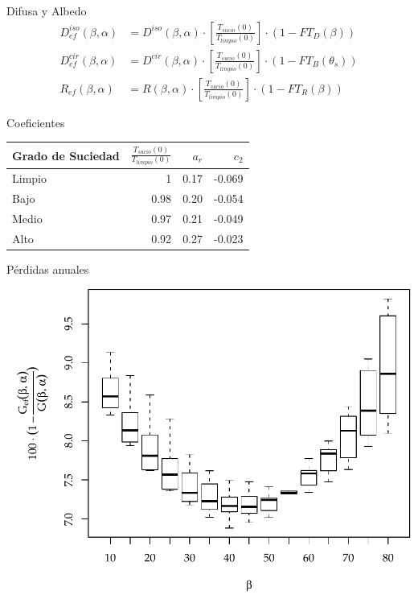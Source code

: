 \documentclass[xcolor={usenames,svgnames,dvipsnames}]{beamer}
\begin{document}
\begin{frame}[label={sec:org26ee36b}]{Difusa y Albedo}
\begin{align*}
D_{ef}^{iso}(\beta,\alpha) &= D^{iso}(\beta,\alpha)\cdot\left[\frac{T_{sucio}(0)}{T_{limpio}(0)}\right]\cdot(1-FT_{D}(\beta))\\
D_{ef}^{cir}(\beta,\alpha) &= D^{cir}(\beta,\alpha)\cdot\left[\frac{T_{sucio}(0)}{T_{limpio}(0)}\right]\cdot(1-FT_{B}(\theta_{s}))\\
R_{ef}(\beta,\alpha) &= R(\beta,\alpha)\cdot\left[\frac{T_{sucio}(0)}{T_{limpio}(0)}\right]\cdot(1-FT_{R}(\beta))
\end{align*}
\end{frame}
\begin{frame}[label={sec:org3795789}]{Coeficientes}
\begin{center}
\begin{tabular}{lrrr}
Grado de Suciedad & \(\frac{T_{sucio}(0)}{T_{limpio}(0)}\) & \(a_{r}\) & \(c_{2}\)\\
\hline
Limpio & 1 & 0.17 & -0.069\\
Bajo & 0.98 & 0.20 & -0.054\\
Medio & 0.97 & 0.21 & -0.049\\
Alto & 0.92 & 0.27 & -0.023\\
\end{tabular}
\end{center}
\end{frame}

\begin{frame}[label={sec:orgf855a8f}]{Pérdidas anuales}
\begin{center}
\includegraphics[width=.9\linewidth]{../figs/GefVSG.pdf}
\end{center}
\end{frame}
\end{document}
